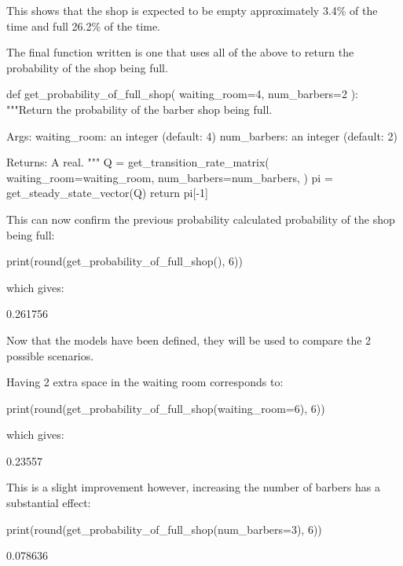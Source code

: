This shows that the shop is expected to be empty approximately 3.4\% of the time
and full 26.2\% of the time.

The final function written is one that uses all of
the above to return the probability of the shop being full.

\begin{pyin}
def get_probability_of_full_shop(
    waiting_room=4, num_barbers=2
):
    """Return the probability of the barber shop being full.

    Args:
        waiting_room: an integer (default: 4)
        num_barbers: an integer (default: 2)

    Returns:
        A real.
    """
    Q = get_transition_rate_matrix(
        waiting_room=waiting_room,
        num_barbers=num_barbers,
    )
    pi = get_steady_state_vector(Q)
    return pi[-1]
\end{pyin}

This can now confirm the previous probability calculated probability of the shop
being full:

\begin{pyin}
print(round(get_probability_of_full_shop(), 6))
\end{pyin}

which gives:

\begin{pyout}
0.261756
\end{pyout}

Now that the models have been defined, they will be used to compare the 2
possible scenarios.

Having 2 extra space in the waiting room corresponds to:

\begin{pyin}
print(round(get_probability_of_full_shop(waiting_room=6), 6))
\end{pyin}

which gives:

\begin{pyout}
0.23557
\end{pyout}

This is a slight improvement however, increasing the number of barbers has a
substantial effect:

\begin{pyin}
print(round(get_probability_of_full_shop(num_barbers=3), 6))
\end{pyin}

\begin{pyout}
0.078636
\end{pyout}

